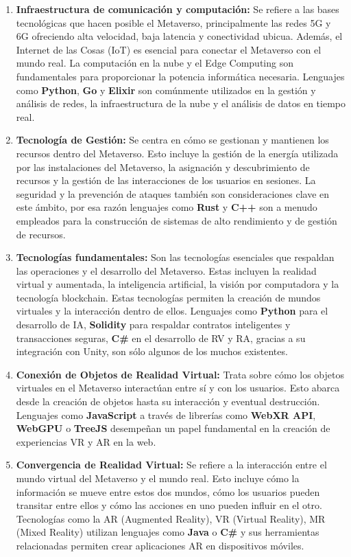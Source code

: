 \documentclass[a4paper,10pt]{article}
\begin{document}
	\begin{enumerate}
		\item \textbf{Infraestructura de comunicación y computación:} Se refiere a las bases tecnológicas que hacen posible el Metaverso, principalmente las redes 5G y 6G ofreciendo alta velocidad, baja latencia y conectividad ubicua. Además, el Internet de las Cosas (IoT) es esencial para conectar el Metaverso con el mundo real. La computación en la nube y el Edge Computing son fundamentales para proporcionar la potencia informática necesaria. Lenguajes como \textbf{Python}, \textbf{Go} y \textbf{Elixir} son comúnmente utilizados en la gestión y análisis de redes, la infraestructura de la nube y el análisis de datos en tiempo real.
		\item \textbf{Tecnología de Gestión:} Se centra en cómo se gestionan y mantienen los recursos dentro del Metaverso. Esto incluye la gestión de la energía utilizada por las instalaciones del Metaverso, la asignación y descubrimiento de recursos y la gestión de las interacciones de los usuarios en sesiones. La seguridad y la prevención de ataques también son consideraciones clave en este ámbito, por esa razón lenguajes como \textbf{Rust} y \textbf{C++} son a menudo empleados para la construcción de sistemas de alto rendimiento y de gestión de recursos.
		\item \textbf{Tecnologías fundamentales:} Son las tecnologías esenciales que respaldan las operaciones y el desarrollo del Metaverso. Estas incluyen la realidad virtual y aumentada, la inteligencia artificial, la visión por computadora y la tecnología blockchain. Estas tecnologías permiten la creación de mundos virtuales y la interacción dentro de ellos. Lenguajes como \textbf{Python} para el desarrollo de IA, \textbf{Solidity} para respaldar contratos inteligentes y transacciones seguras, \textbf{C\#} en el desarrollo de RV y RA, gracias a su integración con Unity, son sólo algunos de los muchos existentes.
		\item \textbf{Conexión de Objetos de Realidad Virtual:} Trata sobre cómo los objetos virtuales en el Metaverso interactúan entre sí y con los usuarios. Esto abarca desde la creación de objetos hasta su interacción y eventual destrucción. Lenguajes como \textbf{JavaScript} a través de librerías como \textbf{WebXR API}, \textbf{WebGPU} o \textbf{TreeJS} desempeñan un papel fundamental en la creación de experiencias VR y AR en la web.
		\item \textbf{Convergencia de Realidad Virtual:} Se refiere a la interacción entre el mundo virtual del Metaverso y el mundo real. Esto incluye cómo la información se mueve entre estos dos mundos, cómo los usuarios pueden transitar entre ellos y cómo las acciones en uno pueden influir en el otro. Tecnologías como la AR (Augmented Reality), VR (Virtual Reality), MR (Mixed Reality) utilizan lenguajes  como \textbf{Java} o \textbf{C\#} y sus herramientas relacionadas permiten crear aplicaciones AR en dispositivos móviles.
	\end{enumerate}
\end{document}
